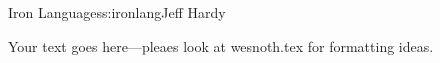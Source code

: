 \begin{aosachapter}{Iron Languages}{s:ironlang}{Jeff Hardy}

Your text goes here---pleaes look at wesnoth.tex for formatting ideas.

\end{aosachapter}
